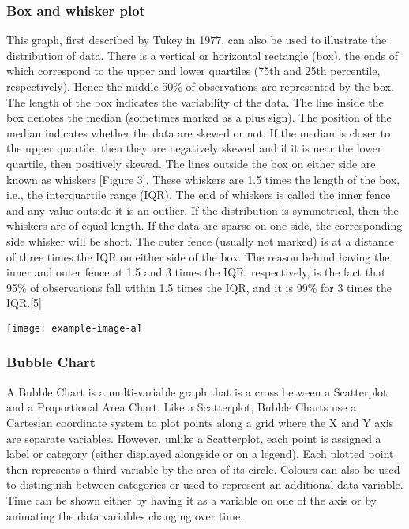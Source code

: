 \subsubsection{Box and whisker plot}
This graph, first described by Tukey in 1977, can also be
used to illustrate the distribution of data. There is a vertical
or horizontal rectangle (box), the ends of which correspond
to the upper and lower quartiles (75th and 25th percentile,
respectively). Hence the middle 50\% of observations are
represented by the box. The length of the box indicates the
variability of the data. The line inside the box denotes the
median (sometimes marked as a plus sign). The position of
the median indicates whether the data are skewed or not.
If the median is closer to the upper quartile, then they are
negatively skewed and if it is near the lower quartile, then
positively skewed.
The lines outside the box on either side are known as whiskers
[Figure 3]. These whiskers are 1.5 times the length of the
box, i.e., the interquartile range (IQR). The end of whiskers is
called the inner fence and any value outside it is an outlier. If
the distribution is symmetrical, then the whiskers are of equal
length. If the data are sparse on one side, the corresponding side
whisker will be short. The outer fence (usually not marked)
is at a distance of three times the IQR on either side of the
box. The reason behind having the inner and outer fence at
1.5 and 3 times the IQR, respectively, is the fact that 95\% of
observations fall within 1.5 times the IQR, and it is 99\% for
3 times the IQR.[5]

\texttt{[image: example-image-a]} 

\subsubsection{Bubble Chart}
A Bubble Chart is a multi-variable graph that is a cross between a Scatterplot 
and a Proportional Area Chart. Like a Scatterplot, Bubble Charts use a Cartesian 
coordinate system to plot points along a grid where the X and Y axis are separate 
variables. However. unlike a Scatterplot, each point is assigned a label or 
category (either displayed alongside or on a legend). Each plotted point then 
represents a third variable by the area of its circle. Colours can also be used 
to distinguish between categories or used to represent an additional data variable. 
Time can be shown either by having it as a variable on one of the axis or by 
animating the data variables changing over time.

